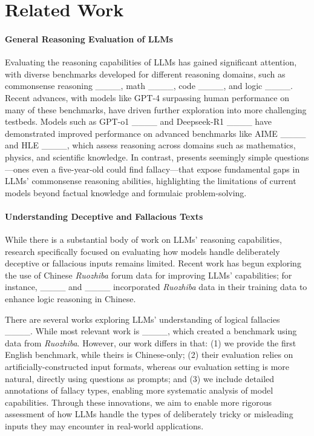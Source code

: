 \section{Related Work}
\label{sec:related_work}

\paragraph{General Reasoning Evaluation of LLMs}
Evaluating the reasoning capabilities of LLMs has gained significant attention, with diverse benchmarks developed for different reasoning domains, such as commonsense reasoning ____, math ____, code ____, and logic ____. 
Recent advances, with models like GPT-4 surpassing human performance on many of these benchmarks, have driven further exploration into more challenging testbeds. Models such as GPT-o1 ____ and Deepseek-R1 ____ have demonstrated improved performance on advanced benchmarks like AIME ____ and HLE ____, which assess reasoning across domains such as mathematics, physics, and scientific knowledge. In contrast, \data presents seemingly simple questions---ones even a five-year-old could find fallacy---that expose fundamental gaps in LLMs’ commonsense reasoning abilities, highlighting the limitations of current models beyond factual knowledge and formulaic problem-solving.


\paragraph{Understanding Deceptive and Fallacious Texts}
While there is a substantial body of work on LLMs' reasoning capabilities, research specifically focused on evaluating how models handle deliberately deceptive or fallacious inputs remains limited. Recent work has begun exploring the use of Chinese \textit{Ruozhiba} forum data for improving LLMs' capabilities; for instance, ____ and ____ incorporated \textit{Ruozhiba} data in their training data to enhance logic reasoning in Chinese. 

There are several works exploring LLMs' understanding of logical fallacies ____. While most relevant work is ____, which created a benchmark using data from \textit{Ruozhiba}. However, our work differs in that: (1) we provide the first English benchmark, while theirs is Chinese-only; (2) their evaluation relies on artificially-constructed input formats, whereas our evaluation setting is more natural, directly using questions as prompts; and (3) we include detailed annotations of fallacy types, enabling more systematic analysis of model capabilities.
Through these innovations, we aim to enable more rigorous assessment of how LLMs handle the types of deliberately tricky or misleading inputs they may encounter in real-world applications.
